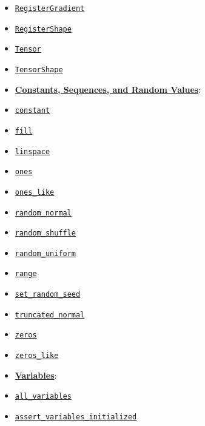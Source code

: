 \begin{itemize}
\item
  \href{../../api_docs/python/framework.md\#RegisterGradient}{\texttt{RegisterGradient}}
\item
  \href{../../api_docs/python/framework.md\#RegisterShape}{\texttt{RegisterShape}}
\item
  \href{../../api_docs/python/framework.md\#Tensor}{\texttt{Tensor}}
\item
  \href{../../api_docs/python/framework.md\#TensorShape}{\texttt{TensorShape}}
\item
  \textbf{\href{../../api_docs/python/constant_op.md}{Constants,
  Sequences, and Random Values}}:
\item
  \href{../../api_docs/python/constant_op.md\#constant}{\texttt{constant}}
\item
  \href{../../api_docs/python/constant_op.md\#fill}{\texttt{fill}}
\item
  \href{../../api_docs/python/constant_op.md\#linspace}{\texttt{linspace}}
\item
  \href{../../api_docs/python/constant_op.md\#ones}{\texttt{ones}}
\item
  \href{../../api_docs/python/constant_op.md\#ones_like}{\texttt{ones\_like}}
\item
  \href{../../api_docs/python/constant_op.md\#random_normal}{\texttt{random\_normal}}
\item
  \href{../../api_docs/python/constant_op.md\#random_shuffle}{\texttt{random\_shuffle}}
\item
  \href{../../api_docs/python/constant_op.md\#random_uniform}{\texttt{random\_uniform}}
\item
  \href{../../api_docs/python/constant_op.md\#range}{\texttt{range}}
\item
  \href{../../api_docs/python/constant_op.md\#set_random_seed}{\texttt{set\_random\_seed}}
\item
  \href{../../api_docs/python/constant_op.md\#truncated_normal}{\texttt{truncated\_normal}}
\item
  \href{../../api_docs/python/constant_op.md\#zeros}{\texttt{zeros}}
\item
  \href{../../api_docs/python/constant_op.md\#zeros_like}{\texttt{zeros\_like}}
\item
  \textbf{\href{../../api_docs/python/state_ops.md}{Variables}}:
\item
  \href{../../api_docs/python/state_ops.md\#all_variables}{\texttt{all\_variables}}
\item
  \href{../../api_docs/python/state_ops.md\#assert_variables_initialized}{\texttt{assert\_variables\_initialized}}

\end{itemize}
